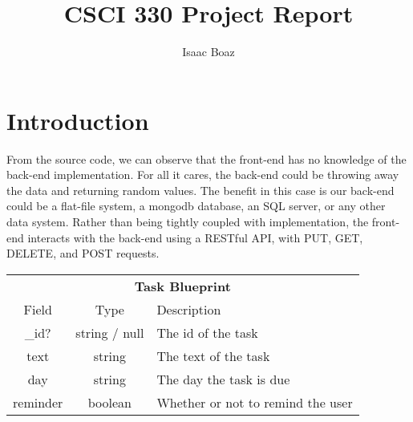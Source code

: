 \documentclass{article}
\title{CSCI 330 Project Report}
\author{Isaac Boaz}
\begin{document}
\maketitle

\section{Introduction}

From the source code, we can observe that the front-end has no knowledge of the back-end implementation. For all it cares, the back-end could be throwing away the data and returning random values.
The benefit in this case is our back-end could be a flat-file system, a mongodb database, an SQL server, or any other data system.
Rather than being tightly coupled with implementation, the front-end interacts with the back-end using a RESTful API, with PUT, GET, DELETE, and POST requests.

\vspace{1em}

\begin{tabular}{|c|c|l|}
    \hline
    \multicolumn{3}{|c|}{\textbf{Task Blueprint}}                \\
    Field    & Type          & Description                       \\
    \hline
    \_id?    & string / null & The id of the task                \\
    text     & string        & The text of the task              \\
    day      & string        & The day the task is due           \\
    reminder & boolean       & Whether or not to remind the user \\
    \hline
\end{tabular}
\end{document}
